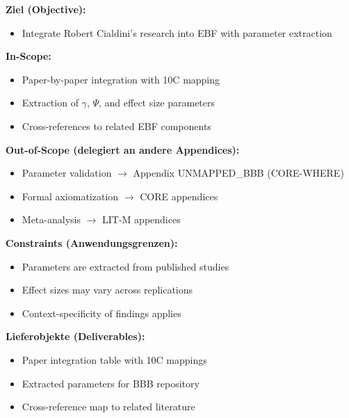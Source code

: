 
\begin{tcolorbox}[
    colback=orange!5!white,
    colframe=orange!75!black,
    title={\textbf{Appendix Scope: Ziel / In-Scope / Out-of-Scope / Constraints}},
    fonttitle=\bfseries
]

\textbf{Ziel (Objective):}
\begin{itemize}[nosep]
    \item Integrate Robert Cialdini's research into EBF with parameter extraction
\end{itemize}

\textbf{In-Scope:}
\begin{itemize}[nosep]
    \item Paper-by-paper integration with 10C mapping
    \item Extraction of $\gamma$, $\Psi$, and effect size parameters
    \item Cross-references to related EBF components
\end{itemize}

\textbf{Out-of-Scope (delegiert an andere Appendices):}
\begin{itemize}[nosep]
    \item Parameter validation $\rightarrow$ Appendix UNMAPPED_BBB (CORE-WHERE)
    \item Formal axiomatization $\rightarrow$ CORE appendices
    \item Meta-analysis $\rightarrow$ LIT-M appendices
\end{itemize}

\textbf{Constraints (Anwendungsgrenzen):}
\begin{itemize}[nosep]
    \item Parameters are extracted from published studies
    \item Effect sizes may vary across replications
    \item Context-specificity of findings applies
\end{itemize}

\textbf{Lieferobjekte (Deliverables):}
\begin{itemize}[nosep]
    \item Paper integration table with 10C mappings
    \item Extracted parameters for BBB repository
    \item Cross-reference map to related literature
\end{itemize}

\end{tcolorbox}

